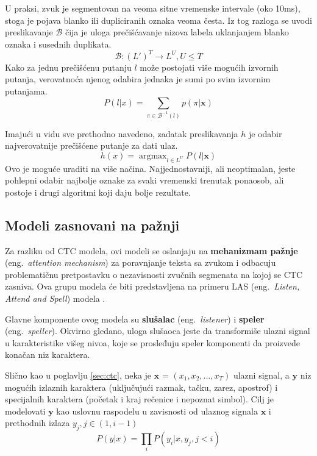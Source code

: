 \documentclass[a4paper]{article}
\DeclareMathOperator*{\argmax}{argmax}
\begin{document}
U praksi, zvuk je segmentovan na veoma sitne vremenske intervale (oko 10ms), stoga je pojava blanko ili dupliciranih oznaka veoma česta. 
Iz tog razloga se uvodi preslikavanje $\mathcal{B}$ čija je uloga prečišćavanje nizova labela uklanjanjem blanko oznaka i susednih duplikata.
\begin{equation*}
  \mathcal{B}: (L')^T \rightarrow L^U, U \leq T
\end{equation*}
Kako za jednu prečišćenu putanju $l$ može postojati više mogućih izvornih putanja, verovatnoća njenog odabira jednaka je sumi po svim izvornim putanjama.
\begin{equation}
\label{eq:beta}
  P(l | x) = \sum_{\pi \in \mathcal{B}^{-1}(l)} p(\pi | \textbf{x})
\end{equation}

Imajući u vidu sve prethodno navedeno, zadatak preslikavanja $h$ je odabir najverovatnije prečišćene putanje za dati ulaz.
\begin{equation}
\label{eq:h_x}
  h(x) = \argmax_{l \in L^U} P(l | \textbf{x})
\end{equation}
Ovo je moguće uraditi na više načina.
Najjednostavniji, ali neoptimalan, jeste pohlepni odabir najbolje oznake za svaki vremenski trenutak ponaosob, ali postoje i drugi algoritmi koji daju bolje rezultate.


\subsection{Modeli zasnovani na pažnji}

Za razliku od CTC modela, ovi modeli se oslanjaju na \textbf{mehanizmam pažnje} (eng.~{\em attention mechanism}) za poravnjanje teksta sa zvukom i odbacuju problematičnu pretpostavku o nezavisnosti zvučnih segmenata na kojoj se CTC zasniva.
Ova grupu modela će biti predstavljena na primeru LAS (eng.~{\em Listen, Attend and Spell}) modela \cite{chan2015las}. 

Glavne komponente ovog modela su \textbf{slušalac} (eng.~{\em listener}) i \textbf{speler} (eng.~{\em speller}).
Okvirno gledano, uloga slušaoca jeste da transformiše ulazni signal u karakteristike višeg nivoa, koje se prosleđuju speler komponenti da proizvede konačan niz karaktera. 

Slično kao u poglavlju \ref{sec:ctc}, neka je $\textbf{x}$ = $(x_1,  x_2,  ...,  x_T)$ ulazni signal, a $\textbf{y}$ niz mogućih izlaznih karaktera (uključujući razmak, tačku, zarez, apostrof) i specijalnih karaktera (početak i kraj rečenice i nepoznat simbol).
Cilj je modelovati $\textbf{y}$ kao uslovnu raspodelu u zavisnosti od ulaznog signala $\textbf{x}$ i prethodnih izlaza $y_j,  j \in (1,  i-1)$
\begin{equation}
  \label{eq:chain}
  P(y | x) = \prod_i P(y_i | x, y_j, j < i)
\end{equation}
\end{document}
